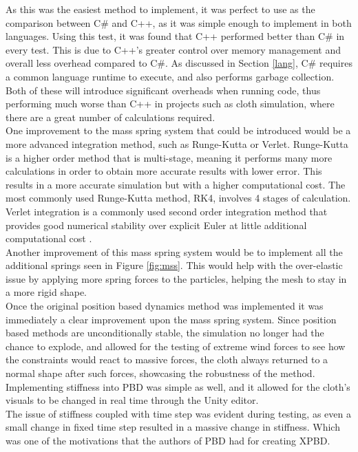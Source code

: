 \documentclass[12pt,a4paper]{article}
\begin{document}
As this was the easiest method to implement, it was perfect to use as the comparison between C\# and C++, as it was simple enough to implement in both languages. Using this test, it was found that C++ performed better than C\# in every test. This is due to C++'s greater control over memory management and overall less overhead compared to C\#. As discussed in Section \ref{lang}, C\# requires a common language runtime to execute, and also performs garbage collection. Both of these will introduce significant overheads when running code, thus performing much worse than C++ in projects such as cloth simulation, where there are a great number of calculations required.
\\

One improvement to the mass spring system that could be introduced would be a more advanced integration method, such as Runge-Kutta or Verlet. Runge-Kutta is a higher order method that is multi-stage, meaning it performs many more calculations in order to obtain more accurate results with lower error. This results in a more accurate simulation but with a higher computational cost. The most commonly used Runge-Kutta method, RK4, involves 4 stages of calculation. Verlet integration is a commonly used second order integration method that provides good numerical stability over explicit Euler at little additional computational cost \cite{gould2007introduction}. 
\\

Another improvement of this mass spring system would be to implement all the additional springs seen in Figure \ref{fig:mss}. This would help with the over-elastic issue by applying more spring forces to the particles, helping the mesh to stay in a more rigid shape.
\\

Once the original position based dynamics method was implemented it was immediately a clear improvement upon the mass spring system. Since position based methods are unconditionally stable, the simulation no longer had the chance to explode, and allowed for the testing of extreme wind forces to see how the constraints would react to massive forces, the cloth always returned to a normal shape after such forces, showcasing the robustness of the method. Implementing stiffness into PBD was simple as well, and it allowed for the cloth's visuals to be changed in real time through the Unity editor. \\
The issue of stiffness coupled with time step was evident during testing, as even a small change in fixed time step resulted in a massive change in stiffness. Which was one of the motivations that the authors of PBD had for creating XPBD. \\
\end{document}

